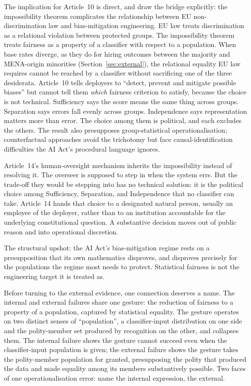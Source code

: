\documentclass[12pt]{article}
\begin{document}
The implication for Article~10 is direct, and \citet{wachter2021} draw the bridge explicitly: the impossibility theorem complicates the relationship between EU non-discrimination law and bias-mitigation engineering. EU law treats discrimination as a relational violation between protected groups. The impossibility theorem treats fairness as a property of a classifier with respect to a population. When base rates diverge, as they do for hiring outcomes between the majority and MENA-origin minorities (Section~\ref{sec:external}), the relational equality EU law requires cannot be reached by a classifier without sacrificing one of the three desiderata. Article~10 tells deployers to \enquote{detect, prevent and mitigate possible biases} but cannot tell them \emph{which} fairness criterion to satisfy, because the choice is not technical. Sufficiency says the score means the same thing across groups. Separation says errors fall evenly across groups. Independence says representation matters more than error. The choice among them is political, and each excludes the others. The result also presupposes group-statistical operationalisation; counterfactual approaches \citep{kusner2017} avoid the trichotomy but face causal-identification difficulties the AI Act's procedural language ignores.

Article~14's human-oversight mechanism inherits the impossibility instead of resolving it. The overseer is supposed to step in when the system errs. But the trade-off they would be stepping into has no technical solution: it is the political choice among Sufficiency, Separation, and Independence that no classifier can take. Article~14 hands that choice to a designated natural person, usually an employee of the deployer, rather than to an institution accountable for the underlying constitutional question. A substantive decision moves out of public reason and into operational discretion.

The structural upshot: the AI Act's bias-mitigation regime rests on a presupposition that its own mathematics disproves, and disproves precisely for the populations the regime most needs to protect. Statistical fairness is not the engineering target it is treated as.

Before turning to the external evidence, one connection deserves a name. The internal and external failures share one gesture: the reduction of fairness to a property of a population, captured by statistical equality. The gesture operates on two distinct senses of \enquote{population}, a classifier-input distribution on one side and the polity-member set produced by recognition on the other, and collapses them. The internal failure shows the gesture cannot succeed even when the classifier-input population is given; the external failure shows the gesture takes the polity-member population for granted, presupposing the polity that produced the data and made equality among its members substantively possible. Two faces of one operationalisation error: \citet{wachter2021} name the internal expression, \citet{arendt1951} the external.
\end{document}
